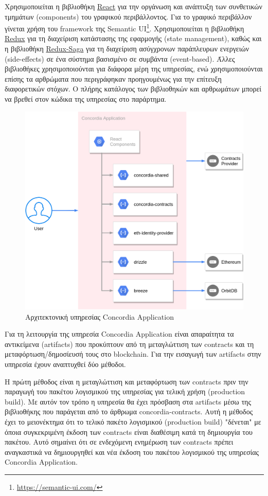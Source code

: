Χρησιμοποιείται η βιβλιοθήκη \hyperref[subsection:4-2-2-1-react]{React} για την οργάνωση και ανάπτυξη των συνθετικών τμημάτων (components) του γραφικού περιβάλλοντος. Για το γραφικό περιβάλλον γίνεται χρήση του framework της Semantic UI\footnote{\url{https://semantic-ui.com/}}. Χρησιμοποιείται η βιβλιοθήκη \hyperref[subsection:4-2-2-2-redux]{Redux} για τη διαχείριση κατάστασης της εφαρμογής (state management),
καθώς και η βιβλιοθήκη \hyperref[subsection:4-2-2-3-redux-saga]{Redux-Saga} για τη διαχείριση ασύγχρονων παράπλευρων ενεργειών (side-effects) σε ένα σύστημα βασισμένο σε συμβάντα (event-based). Άλλες βιβλιοθήκες χρησιμοποιούνται για διάφορα μέρη της υπηρεσίας, ενώ χρησιμοποιούνται επίσης τα αρθρώματα που περιγράφηκαν προηγουμένως για την επίτευξη διαφορετικών στόχων. Ο πλήρης κατάλογος των βιβλιοθηκών και αρθρωμάτων μπορεί να βρεθεί στον κώδικα της υπηρεσίας στο παράρτημα. %

\begin{figure}[H]
    \centering
    \includegraphics[width=.7\textwidth]{assets/figures/chapter-4/4.3.architecture-4.3.2.concordia-application-architecture.png}
    \caption{Αρχιτεκτονική υπηρεσίας Concordia Application}
    \label{figure:4-3-concordia-application-architecture}
\end{figure}

Για τη λειτουργία της υπηρεσία Concordia Application είναι απαραίτητα τα αντικείμενα (artifacts) που προκύπτουν από τη μεταγλώττιση των contracts και τη μεταφόρτωση/δημοσίευσή τους στο blockchain. Για την εισαγωγή των artifacts στην υπηρεσία έχουν αναπτυχθεί δύο μέθοδοι.

Η πρώτη μέθοδος είναι η μεταγλώττιση και μεταφόρτωση των contracts πριν την παραγωγή του πακέτου λογισμικού της υπηρεσίας για τελική χρήση (production build). Με αυτόν τον τρόπο η υπηρεσία θα έχει πρόσβαση στα artifacts μέσω της βιβλιοθήκης που παράγεται από το άρθρωμα concordia-contracts. Αυτή η μέθοδος έχει το μειονέκτημα ότι το τελικό πακέτο λογισμικού (production build) "δένεται" με όποια συγκεκριμένη έκδοση των contracts είναι διαθέσιμη κατά τη δημιουργία του πακέτου. Αυτό σημαίνει ότι σε ενδεχόμενη ενημέρωση των contracts πρέπει αναγκαστικά να δημιουργηθεί και νέα έκδοση του πακέτου λογισμικού της υπηρεσίας Concordia Application.

